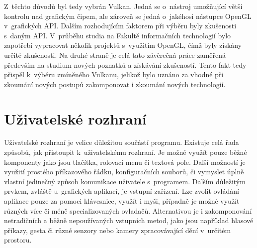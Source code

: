 Z~těchto důvodů byl tedy vybrán Vulkan. Jedná se o~nástroj umožňující větší kontrolu nad grafickým čipem, ale zároveň se jedná o~jakéhosi nástupce OpenGL v~grafických API. Dalším rozhodujícím faktorem při výběru byly zkušenosti s~daným API. V~průběhu studia na Fakultě informačních technologií bylo zapotřebí vypracovat několik projektů s~využitím OpenGL, čímž byly získány určité zkušenosti. Na druhé straně je celá tato závěrečná práce zaměřená především na studium nových poznatků a získávání zkušeností. Tento fakt tedy přispěl k~výběru zmíněného Vulkanu, jelikož bylo uznáno za vhodné při zkoumání nových postupů zakomponovat i zkoumání nových technologií.

\section{Uživatelské rozhraní}
Uživatelské rozhraní je velice důležitou součástí programu. Existuje celá řada způsobů, jak přistoupit k~uživatelskému rozhraní. Je možné využít pouze běžné komponenty jako jsou tlačítka, rolovací menu či textová pole. Další možností je využití prostého příkazového řádku, konfiguračních souborů, či vymyslet úplně vlastní jedinečný způsob komunikace uživatele s~programem. Dalším důležitým prvkem, zvláště u~grafických aplikací, je vstupní zařízení. Lze zvolit ovládání aplikace pouze za pomoci klávesnice, využít i myši, případně je možné využít různých více či méně specializovaných ovladačů. Alternativou je i zakomponování netradičních a běžně nepoužívaných vstupních metod, jako jsou například hlasové příkazy, gesta či různé senzory nebo kamery zpracovávající dění v~určitém prostoru.

